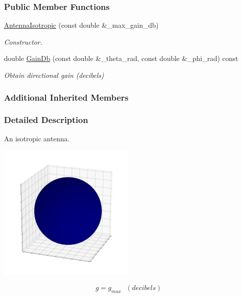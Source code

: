 \subsubsection*{Public Member Functions}
\begin{DoxyCompactItemize}
\item 
\hyperlink{classosse_1_1collaborate_1_1_antenna_isotropic_ae431744ad97d6b0a1d25039e94b4ffcb}{Antenna\+Isotropic} (const double \&\+\_\+max\+\_\+gain\+\_\+db)
\begin{DoxyCompactList}\small\item\em Constructor. \end{DoxyCompactList}\item 
double \hyperlink{classosse_1_1collaborate_1_1_antenna_isotropic_ab695187eb238b78ac03f27bd1cbffc11}{Gain\+Db} (const double \&\+\_\+theta\+\_\+rad, const double \&\+\_\+phi\+\_\+rad) const
\begin{DoxyCompactList}\small\item\em Obtain directional gain (decibels) \end{DoxyCompactList}\end{DoxyCompactItemize}
\subsubsection*{Additional Inherited Members}


\subsubsection{Detailed Description}
An isotropic antenna. 

 
\begin{DoxyImageNoCaption}
  \mbox{\includegraphics[width=0.5\textwidth]{isotropic}}
\end{DoxyImageNoCaption}


\[ g = g_{max}~~~(decibels) \] 

